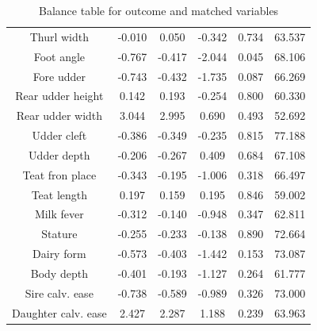 \begin{table}[ht]
\begin{tabular}{cccccc}
  Thurl width & -0.010 & 0.050 & -0.342 & 0.734 & 63.537 \\ 
  Foot angle & -0.767 & -0.417 & -2.044 & 0.045 & 68.106 \\ 
  Fore udder & -0.743 & -0.432 & -1.735 & 0.087 & 66.269 \\ 
  Rear udder height & 0.142 & 0.193 & -0.254 & 0.800 & 60.330 \\ 
  Rear udder width & 3.044 & 2.995 & 0.690 & 0.493 & 52.692 \\ 
  Udder cleft & -0.386 & -0.349 & -0.235 & 0.815 & 77.188 \\ 
  Udder depth & -0.206 & -0.267 & 0.409 & 0.684 & 67.108 \\ 
  Teat fron place & -0.343 & -0.195 & -1.006 & 0.318 & 66.497 \\ 
  Teat length & 0.197 & 0.159 & 0.195 & 0.846 & 59.002 \\ 
  Milk fever & -0.312 & -0.140 & -0.948 & 0.347 & 62.811 \\ 
  Stature & -0.255 & -0.233 & -0.138 & 0.890 & 72.664 \\ 
  Dairy form & -0.573 & -0.403 & -1.442 & 0.153 & 73.087 \\ 
  Body depth & -0.401 & -0.193 & -1.127 & 0.264 & 61.777 \\ 
  Sire calv. ease & -0.738 & -0.589 & -0.989 & 0.326 & 73.000 \\ 
  Daughter calv. ease & 2.427 & 2.287 & 1.188 & 0.239 & 63.963 \\ 
   \hline
\end{tabular}
\caption{Balance table for outcome and matched variables} 
\label{tab:table2}
\end{table}
